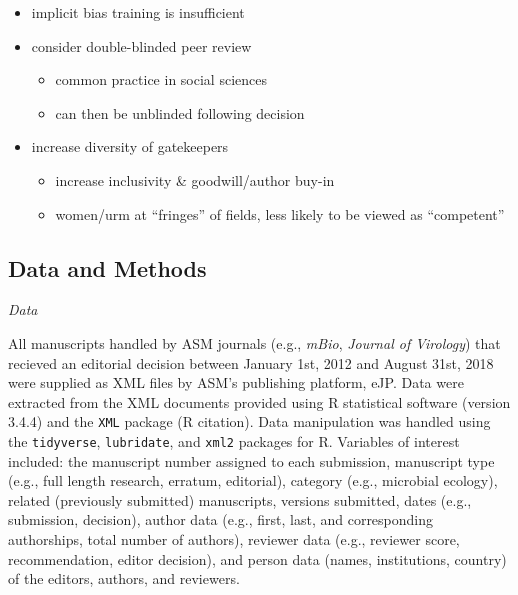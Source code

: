 \documentclass[11pt,]{article}
\providecommand{\tightlist}{%
  \setlength{\itemsep}{0pt}\setlength{\parskip}{0pt}}
\begin{document}
\begin{itemize}
  \begin{itemize}
  \tightlist
  \item
    implicit bias training is insufficient
  \item
    consider double-blinded peer review

    \begin{itemize}
    \tightlist
    \item
      common practice in social sciences
    \item
      can then be unblinded following decision
    \end{itemize}
  \item
    increase diversity of gatekeepers

    \begin{itemize}
    \tightlist
    \item
      increase inclusivity \& goodwill/author buy-in
    \item
      women/urm at ``fringes'' of fields, less likely to be viewed as
      ``competent''
    \end{itemize}
  \end{itemize}
\end{itemize}

\subsection{Data and Methods}\label{data-and-methods}

\emph{Data}

All manuscripts handled by ASM journals (e.g., \emph{mBio},
\emph{Journal of Virology}) that recieved an editorial decision between
January 1st, 2012 and August 31st, 2018 were supplied as XML files by
ASM's publishing platform, eJP. Data were extracted from the XML
documents provided using R statistical software (version 3.4.4) and the
\texttt{XML} package (R citation). Data manipulation was handled using
the \texttt{tidyverse}, \texttt{lubridate}, and \texttt{xml2} packages
for R. Variables of interest included: the manuscript number assigned to
each submission, manuscript type (e.g., full length research, erratum,
editorial), category (e.g., microbial ecology), related (previously
submitted) manuscripts, versions submitted, dates (e.g., submission,
decision), author data (e.g., first, last, and corresponding
authorships, total number of authors), reviewer data (e.g., reviewer
score, recommendation, editor decision), and person data (names,
institutions, country) of the editors, authors, and reviewers.
\end{document}

